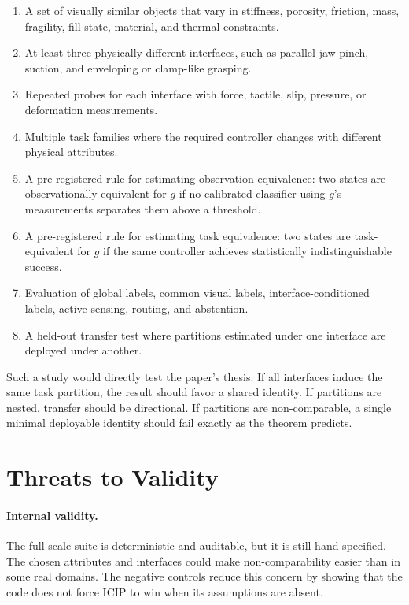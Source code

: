 \documentclass{article}
\newcommand{\icip}{\textsc{ICIP}}
\begin{document}
\begin{enumerate}
    \item A set of visually similar objects that vary in stiffness, porosity, friction, mass, fragility, fill state, material, and thermal constraints.
    \item At least three physically different interfaces, such as parallel jaw pinch, suction, and enveloping or clamp-like grasping.
    \item Repeated probes for each interface with force, tactile, slip, pressure, or deformation measurements.
    \item Multiple task families where the required controller changes with different physical attributes.
    \item A pre-registered rule for estimating observation equivalence: two states are observationally equivalent for $g$ if no calibrated classifier using $g$'s measurements separates them above a threshold.
    \item A pre-registered rule for estimating task equivalence: two states are task-equivalent for $g$ if the same controller achieves statistically indistinguishable success.
    \item Evaluation of global labels, common visual labels, interface-conditioned labels, active sensing, routing, and abstention.
    \item A held-out transfer test where partitions estimated under one interface are deployed under another.
\end{enumerate}

Such a study would directly test the paper's thesis.
If all interfaces induce the same task partition, the result should favor a shared identity.
If partitions are nested, transfer should be directional.
If partitions are non-comparable, a single minimal deployable identity should fail exactly as the theorem predicts.

\section{Threats to Validity}

\paragraph{Internal validity.}
The full-scale suite is deterministic and auditable, but it is still hand-specified.
The chosen attributes and interfaces could make non-comparability easier than in some real domains.
The negative controls reduce this concern by showing that the code does not force \icip{} to win when its assumptions are absent.
\end{document}
